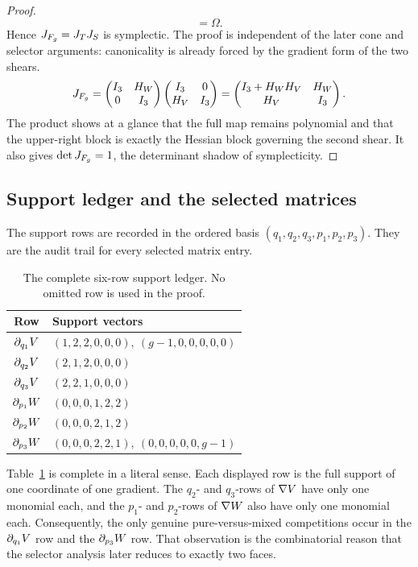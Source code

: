 \documentclass[11pt]{article}
\theoremstyle{remark}
\numberwithin{equation}{section}
\begin{document}
\begin{proof}
\[=\Omega.
\]
Hence \(J_{F_g}=J_TJ_S\) is symplectic.  The proof is independent of the later
cone and selector arguments: canonicality is already forced by the gradient
form of the two shears.
\[
J_{F_g}
=
\begin{pmatrix}
I_3&H_W\\
0&I_3
\end{pmatrix}
\begin{pmatrix}
I_3&0\\
H_V&I_3
\end{pmatrix}
=
\begin{pmatrix}
I_3+H_WH_V&H_W\\
H_V&I_3
\end{pmatrix}.
\]
The product shows at a glance that the full map remains polynomial and that the
upper-right block is exactly the Hessian block governing the second shear.  It
also gives \(\det J_{F_g}=1\), the determinant shadow of symplecticity.
\end{proof}

\subsection{Support ledger and the selected matrices}\label{sec:support}

The support rows are recorded in the ordered basis
\((q_1,q_2,q_3,p_1,p_2,p_3)\).  They are the audit trail for every selected
matrix entry.

\begin{table}[t]
\centering
\small
\begin{tabular}{cl}
\toprule
Row & Support vectors \\
\midrule
\(\partial_{q_1}V\) & \((1,2,2,0,0,0),\ (g-1,0,0,0,0,0)\) \\
\(\partial_{q_2}V\) & \((2,1,2,0,0,0)\) \\
\(\partial_{q_3}V\) & \((2,2,1,0,0,0)\) \\
\(\partial_{p_1}W\) & \((0,0,0,1,2,2)\) \\
\(\partial_{p_2}W\) & \((0,0,0,2,1,2)\) \\
\(\partial_{p_3}W\) & \((0,0,0,2,2,1),\ (0,0,0,0,0,g-1)\) \\
\bottomrule
\end{tabular}
\caption{The complete six-row support ledger.  No omitted row is used in the proof.}
\label{tab:support}
\end{table}

Table~\ref{tab:support} is complete in a literal sense.  Each displayed row is
the full support of one coordinate of one gradient.  The \(q_2\)- and
\(q_3\)-rows of \(\nabla V\) have only one monomial each, and the
\(p_1\)- and \(p_2\)-rows of \(\nabla W\) also have only one monomial each.
Consequently, the only genuine pure-versus-mixed competitions occur in the
\(\partial_{q_1}V\) row and the \(\partial_{p_3}W\) row.  That
observation is the combinatorial reason that the selector analysis later
reduces to exactly two faces.
\end{document}
